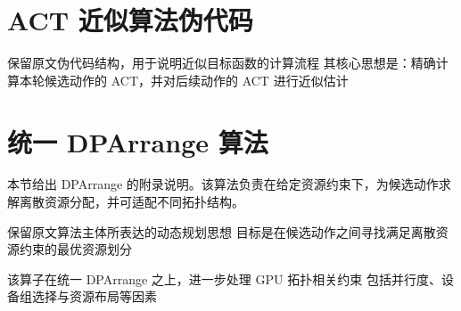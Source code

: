 \section{ACT 近似算法伪代码}

\begin{algorithm}[t]
\caption{ACT 近似。}
\begin{footnotesize}
\begin{algorithmic}[1]
\State 保留原文伪代码结构，用于说明近似目标函数的计算流程
\State 其核心思想是：精确计算本轮候选动作的 ACT，并对后续动作的 ACT 进行近似估计
\end{algorithmic}
\end{footnotesize}
\label{app:act_approx}
\end{algorithm}

\section{统一 DPArrange 算法}

本节给出 DPArrange 的附录说明。该算法负责在给定资源约束下，为候选动作求解离散资源分配，并可适配不同拓扑结构。

\begin{algorithm}[t]
\caption{与拓扑无关的 DPArrange}
\begin{footnotesize}
\begin{algorithmic}[1]
\State 保留原文算法主体所表达的动态规划思想
\State 目标是在候选动作之间寻找满足离散资源约束的最优资源划分
\end{algorithmic}
\end{footnotesize}
\label{app:udp}
\end{algorithm}

\begin{algorithm}[t]
\caption{GPU 拓扑感知 DP 算子}
\begin{footnotesize}
\begin{algorithmic}[1]
\State 该算子在统一 DPArrange 之上，进一步处理 GPU 拓扑相关约束
\State 包括并行度、设备组选择与资源布局等因素
\end{algorithmic}
\end{footnotesize}
\label{app:gpu_dp}
\end{algorithm}
